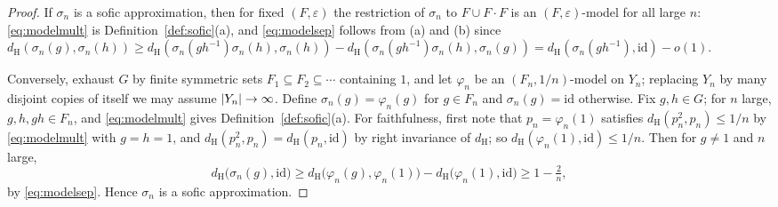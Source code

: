 \documentclass[11pt]{amsart}
\theoremstyle{definition}
\theoremstyle{plain}
\newcommand{\id}{\mathrm{id}}
\newcommand{\eps}{\varepsilon}
\newcommand{\distH}{d_{\mathrm H}}
\DeclarePairedDelimiter{\abs}{\lvert}{\rvert}
\begin{document}
\begin{proof}
If \(\sigma_n\) is a sofic approximation, then for fixed \((F,\eps)\) the restriction of \(\sigma_n\) to \(F\cup F\!\cdot\!F\) is an \((F,\eps)\)-model for all large \(n\): \eqref{eq:modelmult} is Definition~\ref{def:sofic}(a), and \eqref{eq:modelsep} follows from (a) and (b) since \(\distH(\sigma_n(g),\sigma_n(h))\geq\distH(\sigma_n(gh^{-1})\sigma_n(h),\sigma_n(h))-\distH(\sigma_n(gh^{-1})\sigma_n(h),\sigma_n(g))=\distH(\sigma_n(gh^{-1}),\id)-o(1)\).

Conversely, exhaust \(G\) by finite symmetric sets \(F_1\subseteq F_2\subseteq\cdots\) containing \(1\), and let \(\varphi_n\) be an \((F_n,1/n)\)-model on \(Y_n\); replacing \(Y_n\) by many disjoint copies of itself we may assume \(\abs{Y_n}\to\infty\).  Define \(\sigma_n(g)=\varphi_n(g)\) for \(g\in F_n\) and \(\sigma_n(g)=\id\) otherwise.  Fix \(g,h\in G\); for \(n\) large, \(g,h,gh\in F_n\), and \eqref{eq:modelmult} gives Definition~\ref{def:sofic}(a).  For faithfulness, first note that \(p_n=\varphi_n(1)\) satisfies \(\distH(p_n^2,p_n)\leq1/n\) by \eqref{eq:modelmult} with \(g=h=1\), and \(\distH(p_n^2,p_n)=\distH(p_n,\id)\) by right invariance of \(\distH\); so \(\distH(\varphi_n(1),\id)\leq1/n\).  Then for \(g\ne1\) and \(n\) large,
\[
 \distH\bigl(\sigma_n(g),\id\bigr)
 \geq\distH\bigl(\varphi_n(g),\varphi_n(1)\bigr)-\distH\bigl(\varphi_n(1),\id\bigr)
 \geq1-\tfrac2n,
\]
by \eqref{eq:modelsep}.  Hence \(\sigma_n\) is a sofic approximation.
\end{proof}
\end{document}
